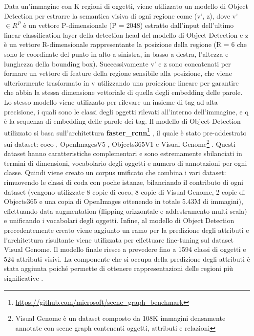 Data un'immagine con K regioni di oggetti, viene utilizzato un modello di Object Detection per estrarre la semantica visiva di ogni regione come (v', z), dove v' $\in R^P$ è un vettore P-dimensionale (P = 2048) estratto dall'input dell'ultimo linear classification layer della detection head del modello di Object Detection e z è un vettore R-dimensionale rappresentante la posizione della regione (R = 6 che sono le coordinate del punto in alto a sinistra, in basso a destra, l'altezza e lunghezza della bounding box). Successivamente v' e z sono concatenati per formare un vettore di feature della regione sensibile alla posizione, che viene ulteriormente trasformato in v utilizzando una proiezione lineare per garantire che abbia la stessa dimensione vettoriale di quella degli embedding delle parole.
Lo stesso modello viene utilizzato per rilevare un insieme di tag ad alta precisione, i quali sono le classi degli oggetti rilevati all'interno dell'immagine, e q è la sequenza di embedding delle parole dei tag.
Il modello di Object Detection utilizzato si basa sull'architettura \textbf{\acrshort{faster_rcnn}}\footnote{\url{https://github.com/microsoft/scene_graph_benchmark}} \cite{ren2015faster}, il quale è stato pre-addestrato sui dataset: \acrshort{coco} \cite{lin2014microsoft}, OpenImagesV5 \cite{kuznetsova2020open}, Objects365V1 \cite{shao2019objects365} e Visual Genome\footnote{Visual Genome è un dataset composto da 108K immagini densamente annotate con scene graph contenenti oggetti, attributi e relazioni} \cite{krishna2017visual}. Questi dataset hanno caratteristiche complementari e sono estremamente sbilanciati in termini di dimensioni, vocabolario degli oggetti e numero di annotazioni per ogni classe. Quindi viene creato un corpus unificato che combina i vari dataset: rimuovendo le classi di coda con poche istanze, bilanciando il contributo di ogni dataset (vengono utilizzate 8 copie di \acrshort{coco}, 8 copie di Visual Genome, 2 copie di Objects365 e una copia di OpenImages ottenendo in totale 5.43M di immagini), effettuando data augmentation (flipping orizzontale e addestramento multi-scala) e unificando i vocabolari degli oggetti.
Infine, al modello di Object Detection precedentemente creato viene aggiunto un ramo per la predizione degli attributi e l'architettura risultante viene utilizzata per effettuare fine-tuning sul dataset Visual Genome.
Il modello finale riesce a prevedere fino a 1594 classi di oggetti e 524 attributi visivi.
La componente che si occupa della predizione degli attributi è stata aggiunta poiché permette di ottenere rappresentazioni delle regioni più significative \cite{anderson2018bottom}.

